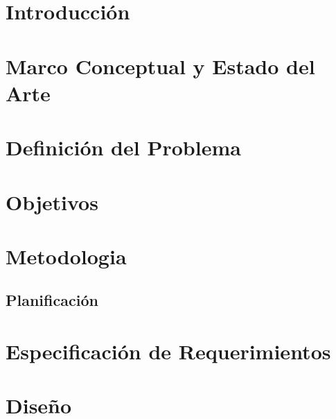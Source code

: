 \documentclass[12pt,letterpaper]{report}
\def\listtablename{Índice de tablas}
\def\tablename{Tabla}}
\begin{document}
\listoffigures
\newpage

\renewcommand{\listtablename}{Índice de tablas} 
\renewcommand{\tablename}{Tabla} 

\listoftables
\newpage



\chapter{Introducci\'on}
\label{ch:Intro}


\chapter{Marco Conceptual y Estado del Arte}
\label{ch:MC}


\chapter{Definición del Problema }
\label{ch:Problema}


\chapter{Objetivos}
\label{ch:OG}


\chapter{Metodologia}
\label{ch:Met}


\section{Planificación}
\label{ch:Plan}


\chapter{Especificación de Requerimientos}
\label{ch:req}


\chapter{Diseño}
\label{ch:Impl}    

\end{document}
